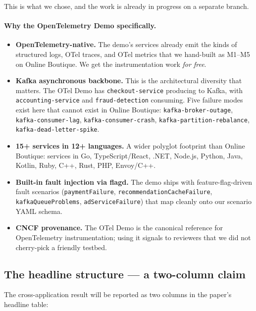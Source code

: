 This is what we chose, and the work is already in progress on a separate branch.

\paragraph{Why the OpenTelemetry Demo specifically.}

\begin{itemize}
\item \textbf{OpenTelemetry-native.} The demo's services already emit the kinds of structured logs, OTel traces, and OTel metrics that we hand-built as M1--M5 on Online Boutique. We get the instrumentation work \emph{for free}.
\item \textbf{Kafka asynchronous backbone.} This is the architectural diversity that matters. The OTel Demo has \texttt{checkout-service} producing to Kafka, with \texttt{accounting-service} and \texttt{fraud-detection} consuming. Five failure modes exist here that cannot exist in Online Boutique: \texttt{kafka-broker-outage}, \texttt{kafka-consumer-lag}, \texttt{kafka-consumer-crash}, \texttt{kafka-partition-rebalance}, \texttt{kafka-dead-letter-spike}.
\item \textbf{15+ services in 12+ languages.} A wider polyglot footprint than Online Boutique: services in Go, TypeScript/React, .NET, Node.js, Python, Java, Kotlin, Ruby, C++, Rust, PHP, Envoy/C++.
\item \textbf{Built-in fault injection via flagd.} The demo ships with feature-flag-driven fault scenarios (\texttt{paymentFailure}, \texttt{recommendationCacheFailure}, \texttt{kafkaQueueProblems}, \texttt{adServiceFailure}) that map cleanly onto our scenario YAML schema.
\item \textbf{CNCF provenance.} The OTel Demo is the canonical reference for OpenTelemetry instrumentation; using it signals to reviewers that we did not cherry-pick a friendly testbed.
\end{itemize}

\subsection{The headline structure --- a two-column claim}

The cross-application result will be reported as two columns in the paper's headline table:

